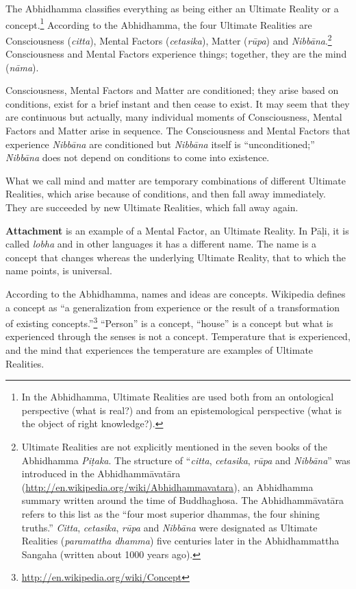 The Abhidhamma classifies everything as being either an Ultimate Reality or a concept.\footnote{In the Abhidhamma, Ultimate Realities are used both from an ontological perspective (what is real?) and from an epistemological perspective (what is the object of right knowledge?).} According to the Abhidhamma, the four Ultimate Realities are Consciousness (\textit{citta}), Mental Factors (\textit{cetasika}), Matter (\textit{rūpa}) and \textit{Nibbāna}.\footnote{Ultimate Realities are not explicitly mentioned in the seven books of the Abhidhamma \textit{Piṭaka}. The structure of “\textit{citta}, \textit{cetasika}, \textit{rūpa} and \textit{Nibbāna}” was introduced in the Abhidhammāvatāra (\url{http://en.wikipedia.org/wiki/Abhidhammavatara}), an Abhidhamma summary written around the time of Buddhaghosa. The Abhidhammāvatāra refers to this list as the “four most superior dhammas, the four shining truths.” \textit{Citta}, \textit{cetasika}, \textit{rūpa} and \textit{Nibbāna} were designated as Ultimate Realities (\textit{paramattha dhamma}) five centuries later in the Abhidhammattha Sangaha (written about 1000 years ago).} Consciousness and Mental Factors experience things; together, they are the mind (\textit{nāma}).

Consciousness, Mental Factors and Matter are conditioned; they arise based on conditions, exist for a brief instant and then cease to exist. It may seem that they are continuous but actually, many individual moments of Consciousness, Mental Factors and Matter arise in sequence. The Consciousness and Mental Factors that experience \textit{Nibbāna} are conditioned but \textit{Nibbāna} itself is “unconditioned;” \textit{Nibbāna} does not depend on conditions to come into existence.

What we call mind and matter are temporary combinations of different Ultimate Realities, which arise because of conditions, and then fall away immediately. They are succeeded by new Ultimate Realities, which fall away again.

\textbf{Attachment} is an example of a Mental Factor, an Ultimate Reality. In Pāḷi, it is called \textit{lobha} and in other languages it has a different name. The name is a concept that changes whereas the underlying Ultimate Reality, that to which the name points, is universal.

\pagebreak

According to the Abhidhamma, names and ideas are concepts. Wikipedia defines a concept as “a generalization from experience or the result of a transformation of existing concepts.”\footnote{\url{http://en.wikipedia.org/wiki/Concept}} “Person” is a concept, “house” is a concept but what is experienced through the senses is not a concept. Temperature that is experienced, and the mind that experiences the temperature are examples of Ultimate Realities.

